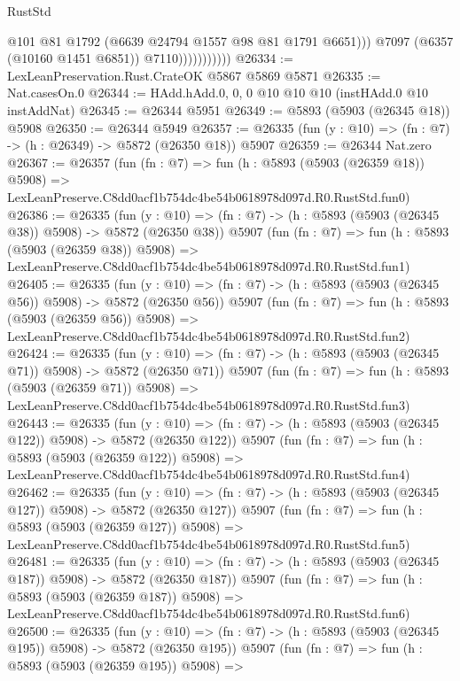 \begin{lexlean}{RustStd}
\begin{coremodule}
                              @101
                              @81
                              @1792
                              (@6639 @24794 @1557 @98 @81 @1791 @6651)))
                          @7097
                          (@6357 (@10160 @1451 @6851))
                          @7110)))))))))))
@26334 := LexLeanPreservation.Rust.CrateOK @5867 @5869 @5871
@26335 := Nat.casesOn.{0}
@26344 := HAdd.hAdd.{0, 0, 0} @10 @10 @10 (instHAdd.{0} @10 instAddNat)
@26345 := @26344 @5951
@26349 := @5893 (@5903 (@26345 @18)) @5908
@26350 := @26344 @5949
@26357 := @26335 (fun (y : @10) => (fn : @7) -> (h : @26349) -> @5872 (@26350 @18)) @5907
@26359 := @26344 Nat.zero
@26367 := @26357
    (fun (fn : @7) =>
    fun (h : @5893 (@5903 (@26359 @18)) @5908) =>
    LexLeanPreserve.C8dd0acf1b754dc4be54b0618978d097d.R0.RustStd.fun0)
@26386 := @26335
    (fun (y : @10) => (fn : @7) -> (h : @5893 (@5903 (@26345 @38)) @5908) -> @5872 (@26350 @38))
    @5907
    (fun (fn : @7) =>
    fun (h : @5893 (@5903 (@26359 @38)) @5908) =>
    LexLeanPreserve.C8dd0acf1b754dc4be54b0618978d097d.R0.RustStd.fun1)
@26405 := @26335
    (fun (y : @10) => (fn : @7) -> (h : @5893 (@5903 (@26345 @56)) @5908) -> @5872 (@26350 @56))
    @5907
    (fun (fn : @7) =>
    fun (h : @5893 (@5903 (@26359 @56)) @5908) =>
    LexLeanPreserve.C8dd0acf1b754dc4be54b0618978d097d.R0.RustStd.fun2)
@26424 := @26335
    (fun (y : @10) => (fn : @7) -> (h : @5893 (@5903 (@26345 @71)) @5908) -> @5872 (@26350 @71))
    @5907
    (fun (fn : @7) =>
    fun (h : @5893 (@5903 (@26359 @71)) @5908) =>
    LexLeanPreserve.C8dd0acf1b754dc4be54b0618978d097d.R0.RustStd.fun3)
@26443 := @26335
    (fun (y : @10) => (fn : @7) -> (h : @5893 (@5903 (@26345 @122)) @5908) -> @5872 (@26350 @122))
    @5907
    (fun (fn : @7) =>
    fun (h : @5893 (@5903 (@26359 @122)) @5908) =>
    LexLeanPreserve.C8dd0acf1b754dc4be54b0618978d097d.R0.RustStd.fun4)
@26462 := @26335
    (fun (y : @10) => (fn : @7) -> (h : @5893 (@5903 (@26345 @127)) @5908) -> @5872 (@26350 @127))
    @5907
    (fun (fn : @7) =>
    fun (h : @5893 (@5903 (@26359 @127)) @5908) =>
    LexLeanPreserve.C8dd0acf1b754dc4be54b0618978d097d.R0.RustStd.fun5)
@26481 := @26335
    (fun (y : @10) => (fn : @7) -> (h : @5893 (@5903 (@26345 @187)) @5908) -> @5872 (@26350 @187))
    @5907
    (fun (fn : @7) =>
    fun (h : @5893 (@5903 (@26359 @187)) @5908) =>
    LexLeanPreserve.C8dd0acf1b754dc4be54b0618978d097d.R0.RustStd.fun6)
@26500 := @26335
    (fun (y : @10) => (fn : @7) -> (h : @5893 (@5903 (@26345 @195)) @5908) -> @5872 (@26350 @195))
    @5907
    (fun (fn : @7) =>
    fun (h : @5893 (@5903 (@26359 @195)) @5908) =>

\end{coremodule}
\end{lexlean}
